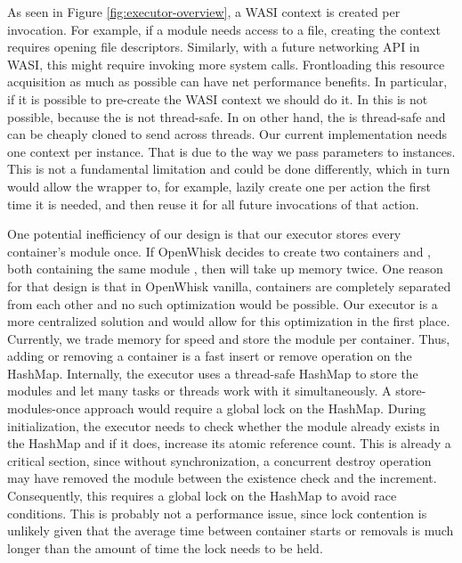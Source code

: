 As seen in Figure \ref{fig:executor-overview}, a WASI context is created per  invocation. For example, if a module needs access to a file, creating the context requires opening file descriptors. Similarly, with a future networking API in WASI, this might require invoking more system calls. Frontloading this resource acquisition as much as possible can have net performance benefits. In particular, if it is possible to pre-create the WASI context we should do it. In  this is not possible, because the  is not thread-safe. In  on other hand, the  is thread-safe and can be cheaply cloned to send across threads. Our current implementation needs one context per instance. That is due to the way we pass parameters to instances. This is not a fundamental limitation and could be done differently, which in turn would allow the  wrapper to, for example, lazily create one  per action the first time it is needed, and then reuse it for all future invocations of that action.

One potential inefficiency of our design is that our executor stores every container's module once. If OpenWhisk decides to create two containers  and , both containing the same module , then  will take up memory twice. One reason for that design is that in OpenWhisk vanilla, containers are completely separated from each other and no such optimization would be possible. Our executor is a more centralized solution and would allow for this optimization in the first place. Currently, we trade memory for speed and store the module per container. Thus, adding or removing a container is a fast insert or remove operation on the HashMap.
Internally, the executor uses a thread-safe HashMap to store the modules and let many tasks or threads work with it simultaneously. A store-modules-once approach would require a global lock on the HashMap. During initialization, the executor needs to check whether the module already exists in the HashMap and if it does, increase its atomic reference count. This is already a critical section, since without synchronization, a concurrent destroy operation may have removed the module between the existence check and the increment. Consequently, this requires a global lock on the HashMap to avoid race conditions. This is probably not a performance issue, since lock contention is unlikely given that the average time between container starts or removals is much longer than the amount of time the lock needs to be held.

